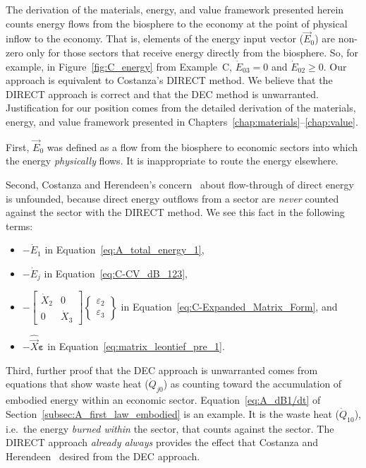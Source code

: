 The derivation of the materials, energy, and value framework
presented herein counts energy flows from the biosphere to the economy
at the point of physical inflow to the economy. 
That is, elements of the energy input vector 
($\vec{E}_{0}$) are non-zero only for those sectors 
that receive energy directly from the biosphere. 
So, for example, in Figure~\ref{fig:C_energy} from Example~C, 
$\dot{E}_{03} = 0$ and $\dot{E}_{02} \ge 0$. 
Our approach is equivalent to Costanza's DIRECT method.
We believe that the DIRECT approach is correct and that the DEC method is unwarranted.
Justification for our position comes from the detailed derivation
of the materials, energy, and value framework presented in 
Chapters~\ref{chap:materials}--\ref{chap:value}. 

First, $\vec{E}_{0}$ was defined as a flow 
from the biosphere to economic sectors into which the energy
\emph{physically} flows.
It is inappropriate to route the energy elsewhere.

Second, Costanza and Herendeen's concern~\cite[pp. 130 \& 138]{Costanza:1984tq} 
about flow-through of direct energy is unfounded, 
because direct energy outflows from a sector
are \emph{never} counted against the sector with the DIRECT method.
We see this fact in the following terms:

\begin{itemize}
	\item{$- \dot{E}_{1}$ in Equation~\ref{eq:A_total_energy_1},}
	\item{$- \dot{E}_{j}$ in Equation~\ref{eq:C-CV_dB_123},}
	\item{$- 
	\begin{bmatrix}
		\dot{X}_{2} & 0          \\
		0           & \dot{X}_{3}
	\end{bmatrix}
	\begin{Bmatrix}
		\varepsilon_{2}\\
		\varepsilon_{3}
	\end{Bmatrix}
	$
	in Equation~\ref{eq:C-Expanded_Matrix_Form}, and}
	\item{$- \hat{\vec{X}}\bm{\varepsilon}$ in Equation~\ref{eq:matrix_leontief_pre_1}.}
\end{itemize}

Third, further proof that the DEC approach is unwarranted
comes from equations that show waste heat ($\dot{Q}_{j0}$)
as counting toward the accumulation of embodied energy within an economic sector.
Equation~\ref{eq:A_dB1/dt} of Section~\ref{subsec:A_first_law_embodied}
is an example. 
It is the waste heat ($\dot{Q}_{10}$), i.e.\ the energy \emph{burned within} the sector,
that counts against the sector.
The DIRECT approach \emph{already always} provides the effect that 
Costanza and Herendeen~\cite{Costanza:1984tq} desired from the DEC approach. 

